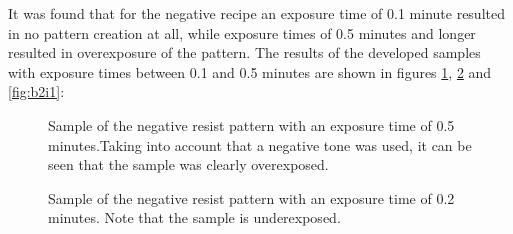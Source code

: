 It was found that for the negative recipe an exposure time of 0.1 minute resulted in no pattern creation at all, while exposure times of 0.5 minutes and longer resulted in overexposure of the pattern. The results of the developed samples with exposure times between 0.1 and 0.5 minutes are shown in figures \ref{fig:b2d1}, \ref{fig:b2h1} and \ref{fig:b2i1}:

\begin{figure}[H]
	\centering
	\caption{Sample of the negative resist pattern with an exposure time of 0.5 minutes.Taking into account that a negative tone was used, it can be seen that the sample was clearly overexposed.}
	\label{fig:b2d1}
\end{figure}
\begin{figure}[H]
	\centering
	\caption{Sample of the negative resist pattern with an exposure time of 0.2 minutes. Note that the sample is underexposed.}
	\label{fig:b2h1}
\end{figure}
